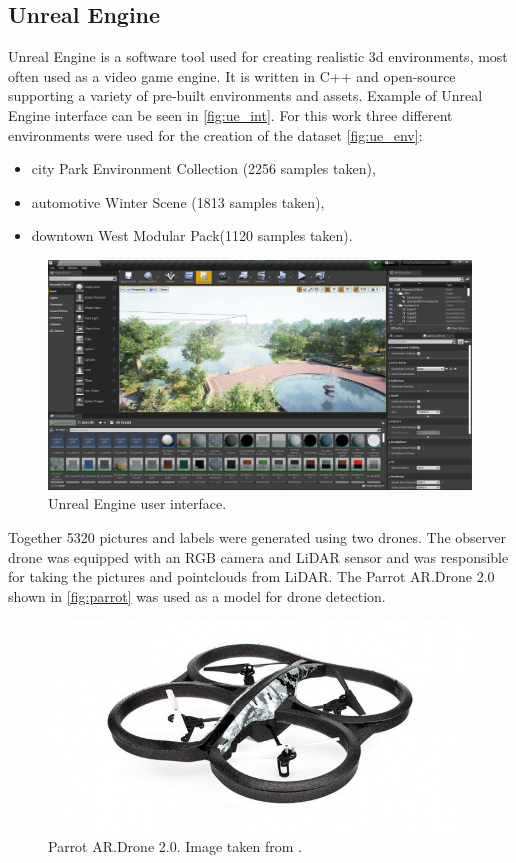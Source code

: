 \documentclass[twoside]{ctuthesis}
\theoremstyle{plain}
\theoremstyle{definition}
\theoremstyle{note}
\begin{document}
\subsection{Unreal Engine}
Unreal Engine is a software tool used for creating realistic 3d environments, most often used as a video game engine. It is written in C++ and open-source supporting a variety of pre-built environments and assets. Example of Unreal Engine interface can be seen in \autoref{fig:ue_int}. For this work three different environments were used for the creation of the dataset \ref{fig:ue_env}:
\begin{itemize}
	\item city Park Environment Collection (2256 samples taken),
	\item automotive Winter Scene (1813 samples taken),
	\item downtown West Modular Pack(1120 samples taken).
\end{itemize}
\begin{figure}
	\centering
	\includegraphics[width=\textwidth]{unreal_ui.png}
	\caption{Unreal Engine user interface.}
	\label{fig:ue_int}
\end{figure}
Together 5320 pictures and labels were generated using two drones. The observer drone was equipped with an RGB camera and LiDAR sensor and was responsible for taking the pictures and pointclouds from LiDAR. The Parrot AR.Drone 2.0 shown in \autoref{fig:parrot} was used as a model for drone detection.
\begin{figure}
	\centering
	\includegraphics[width=\textwidth]{parrot.png}
	\caption{Parrot AR.Drone 2.0. Image taken from \cite{parrot}.}
	\label{fig:parrot}
\end{figure}
\end{document}
